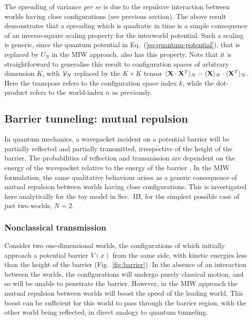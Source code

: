 \documentclass[12pt, aps,pra,amsmath,amssymb,superscriptaddress]{revtex4-2}
\renewcommand{\(}{\left(}
\renewcommand{\)}{\right)}
\newcommand{\blk}{\color{black}}
\begin{document}
The spreading of variance {\it per se} is due to the repulsive interaction
between worlds having close \blk configurations (see previous
section). The above result demonstrates that  a spreading which is \blk
quadratic in time is a simple consequence of an inverse-square scaling property
for the interworld potential.   Such a scaling is generic, since the quantum
potential in Eq.~(\ref{eq:quantum-potential}), that is replaced by $U_N$ in the
MIW approach, also has this property.  Note that it is straightforward to
generalise this result to configuration spaces of arbitrary dimension $K$, with
${\cal V}_N$ replaced by the $K\times K$ tensor $\langle {\bf X}\cdot{\bf X}^T \rangle_N -\langle {\bf
X}\rangle_N \cdot \langle{\bf X}^T\rangle_N$. Here the transpose refers to the 
configuration space index $k$, while the dot-product refers to the world-index $n$ 
as previously.\blk 

\subsection{Barrier tunneling: mutual repulsion}

In quantum mechanics, a wavepacket incident on a potential barrier will be
partially reflected and partially transmitted, irrespective of the height of the
barrier. The probabilities of reflection and transmission are dependent on the
energy of the wavepacket relative to the energy of the barrier \cite{merz}.  In
the MIW formulation, the same qualitative behaviour arises as a generic
consequence of mutual repulsion between worlds having close \blk
configurations.  This is investigated here analytically for the toy model in
Sec.~III, for the simplest possible case of just two worlds, $N=2$. 

\subsubsection{Nonclassical transmission}


Consider two one-dimensional worlds, the configurations of which initially approach a potential barrier $V(x)$ from the same side, with kinetic energies  less than the height of the barrier (Fig.~\ref{fig:barrier}).  In the absence of an interaction between the worlds, the configurations will undergo purely classical motion, and so will be unable to penetrate the barrier.  However, in the MIW  approach the mutual repulsion between worlds will boost the speed of the leading world.  This boost can be sufficient for this world to pass through the barrier region, with the other world being reflected, in direct analogy to quantum tunneling.
\end{document}

